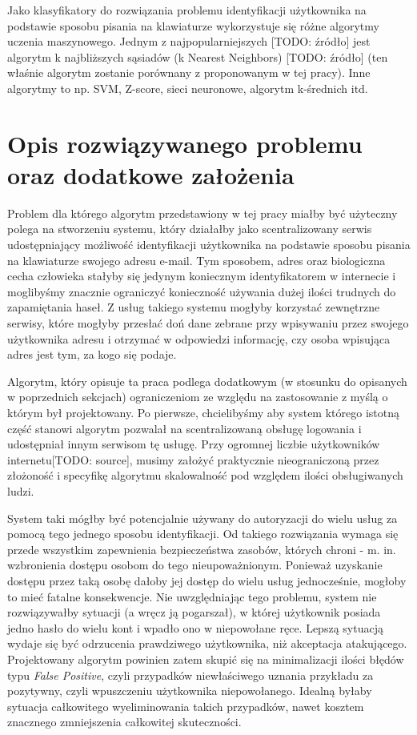 Jako klasyfikatory do rozwiązania problemu identyfikacji użytkownika na podstawie sposobu pisania na klawiaturze wykorzystuje się różne algorytmy uczenia maszynowego. Jednym z najpopularniejszych [TODO: źródło] jest algorytm k najbliższych sąsiadów (k Nearest Neighbors) [TODO: źródło] (ten właśnie algorytm zostanie porównany z proponowanym w tej pracy). Inne algorytmy to np. SVM, Z-score, sieci neuronowe, algorytm k-średnich itd. \cite{BENCHMARK_SET}

\section{Opis rozwiązywanego problemu oraz dodatkowe założenia}
Problem dla którego algorytm przedstawiony w tej pracy miałby być użyteczny polega na stworzeniu systemu, który działałby jako scentralizowany serwis udostępniający możliwość identyfikacji użytkownika na podstawie sposobu pisania na klawiaturze swojego adresu e-mail. Tym sposobem, adres oraz biologiczna cecha człowieka stałyby się jedynym koniecznym identyfikatorem w internecie i moglibyśmy znacznie ograniczyć konieczność używania dużej ilości trudnych do zapamiętania haseł. Z usług takiego systemu mogłyby korzystać zewnętrzne serwisy, które mogłyby przesłać doń dane zebrane przy wpisywaniu przez swojego użytkownika adresu i otrzymać w odpowiedzi informację, czy osoba wpisująca adres jest tym, za kogo się podaje.

Algorytm, który opisuje ta praca podlega dodatkowym (w stosunku do opisanych w poprzednich sekcjach) ograniczeniom ze względu na zastosowanie z myślą o którym był projektowany. Po pierwsze, chcielibyśmy aby system którego istotną część stanowi algorytm pozwalał na scentralizowaną obsługę logowania i udostępniał innym serwisom tę usługę. Przy ogromnej liczbie użytkowników internetu[TODO: source], musimy założyć praktycznie nieograniczoną przez złożoność i specyfikę algorytmu skalowalność pod względem ilości obsługiwanych ludzi.

System taki mógłby być potencjalnie używany do autoryzacji do wielu usług za pomocą tego jednego sposobu identyfikacji. Od takiego rozwiązania wymaga się przede wszystkim zapewnienia bezpieczeństwa zasobów, których chroni - m. in. wzbronienia dostępu osobom do tego nieupoważnionym. Ponieważ uzyskanie dostępu przez taką osobę dałoby jej dostęp do wielu usług jednocześnie, mogłoby to mieć fatalne konsekwencje. Nie uwzględniając tego problemu, system nie rozwiązywałby sytuacji (a wręcz ją pogarszał), w której użytkownik posiada jedno hasło do wielu kont i wpadło ono w niepowołane ręce. Lepszą sytuacją wydaje się być odrzucenia prawdziwego użytkownika, niż akceptacja atakującego. Projektowany algorytm powinien zatem skupić się na minimalizacji ilości błędów typu \textit{False Positive}, czyli przypadków niewłaściwego uznania przykładu za pozytywny, czyli wpuszczeniu użytkownika niepowołanego. Idealną byłaby sytuacja całkowitego wyeliminowania takich przypadków, nawet kosztem znacznego zmniejszenia całkowitej skuteczności.

